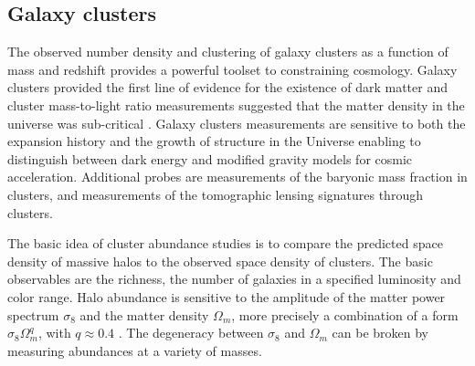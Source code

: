 \subsection{Galaxy clusters}
The observed number density and clustering of galaxy clusters as a function of mass and redshift provides a powerful toolset to constraining cosmology.  Galaxy clusters provided the first line of evidence for the existence of dark matter \textcite{zwicky} and cluster mass-to-light ratio measurements suggested that the matter density in the universe was sub-critical \textcite{Gott}. Galaxy clusters measurements are sensitive to both the expansion history and the growth of structure in the Universe enabling to distinguish between dark energy and modified gravity models for cosmic acceleration. Additional probes are measurements of the baryonic mass fraction in clusters, and measurements of the tomographic lensing signatures through clusters.

The basic idea of cluster abundance studies is to compare the predicted space density of massive halos to the observed space density of clusters. The basic observables are the richness, the number of galaxies in a specified luminosity and color range. Halo abundance is sensitive to the amplitude of the matter power spectrum $\sigma_8$ and the matter density $\Omega_m$, more precisely a combination of a form $\sigma_8\Omega_m^q$, with $q\approx0.4$ \textcite{white}. The degeneracy between $\sigma_8$ and $\Omega_m$ can be broken by measuring abundances at a variety of masses.
